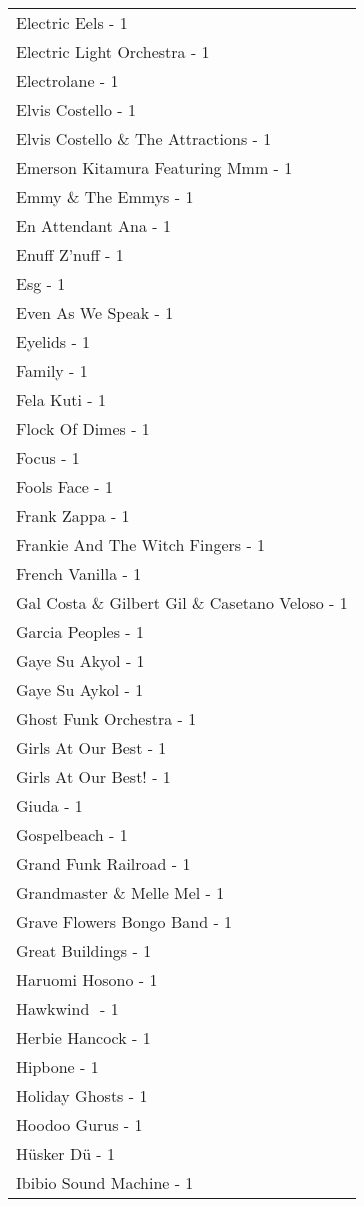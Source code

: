 \documentclass[
]{article}
\begin{document}
\begin{longtable}{l}
Electric Eels - 1 \\ 
Electric Light Orchestra - 1 \\ 
Electrolane - 1 \\ 
Elvis Costello - 1 \\ 
Elvis Costello \& The Attractions - 1 \\ 
Emerson Kitamura Featuring Mmm - 1 \\ 
Emmy \& The Emmys - 1 \\ 
En Attendant Ana - 1 \\ 
Enuff Z'nuff - 1 \\ 
Esg - 1 \\ 
Even As We Speak - 1 \\ 
Eyelids - 1 \\ 
Family - 1 \\ 
Fela Kuti - 1 \\ 
Flock Of Dimes - 1 \\ 
Focus - 1 \\ 
Fools Face - 1 \\ 
Frank Zappa - 1 \\ 
Frankie And The Witch Fingers - 1 \\ 
French Vanilla - 1 \\ 
Gal Costa \& Gilbert Gil \& Casetano Veloso - 1 \\ 
Garcia Peoples - 1 \\ 
Gaye Su Akyol - 1 \\ 
Gaye Su Aykol - 1 \\ 
Ghost Funk Orchestra - 1 \\ 
Girls At Our Best - 1 \\ 
Girls At Our Best! - 1 \\ 
Giuda - 1 \\ 
Gospelbeach - 1 \\ 
Grand Funk Railroad - 1 \\ 
Grandmaster \& Melle Mel - 1 \\ 
Grave Flowers Bongo Band - 1 \\ 
Great Buildings - 1 \\ 
Haruomi Hosono - 1 \\ 
Hawkwind ‎ - 1 \\ 
Herbie Hancock - 1 \\ 
Hipbone - 1 \\ 
Holiday Ghosts - 1 \\ 
Hoodoo Gurus - 1 \\ 
Hüsker Dü - 1 \\ 
Ibibio Sound Machine - 1 \\ 

\end{longtable}
\end{document}
